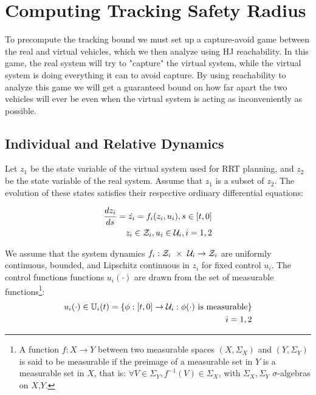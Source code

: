 \section{Computing Tracking Safety Radius \label{sec:reachability}}
To precompute the tracking bound we must set up a capture-avoid game between the real and virtual vehicles, which we then analyze using HJ reachability. In this game, the real system will try to "capture" the virtual system, while the virtual system is doing everything it can to avoid capture. By using reachability to analyze this game we will get a guaranteed bound on how far apart the two vehicles will ever be even when the virtual system is acting as inconveniently as possible.

\subsection{Individual and Relative Dynamics}

Let $z_1$ be the state variable of the virtual system used for RRT planning, and $z_2$ be the state variable of the real system. Assume that $z_1$ is a subset of $z_2$. The evolution of these states satisfies their respective ordinary differential equations:

\begin{equation}
\begin{aligned}
\label{eq:fdyn}
\frac{dz_i}{ds} = \dot{z_i} = f_i(z_i, u_i), s \in [t, 0] \\
z_i \in \mathcal{Z}_i, u_i \in \mathcal{U}_i, i = 1,2
\end{aligned}
\end{equation}

We assume that the system dynamics $f_i : \mathcal{Z}_i\ \times\ \mathcal{U}_i \rightarrow \mathcal{Z}_i$ are uniformly continuous, bounded, and Lipschitz continuous in $z_i$ for fixed control $u_i$. The control functions functions $u_i(\cdot)$ are drawn from the set of measurable functions\footnote{A function $f:X\to Y$ between two measurable spaces $(X,\Sigma_X)$ and $(Y,\Sigma_Y)$ is said to be measurable if the preimage of a measurable set in $Y$ is a measurable set in $X$, that is: $\forall V\in\Sigma_Y, f^{-1}(V)\in\Sigma_X$, with $\Sigma_X,\Sigma_Y$ $\sigma$-algebras on $X$,$Y$.}:
\begin{equation}
\begin{aligned}
u_i(\cdot) \in \mathbb{U}_i(t) = \{\phi: [t, 0] \rightarrow \mathcal{U}_i: \phi(\cdot) \text{ is measurable}\}\\
i = 1,2
\end{aligned}
\end{equation}

